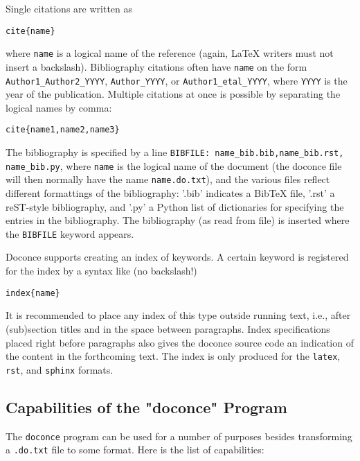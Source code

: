 \documentclass[twoside]{article}
\begin{document}
Single citations are written as
\begin{Verbatim}
cite{name}
\end{Verbatim}
where {\fontsize{10pt}{10pt}\verb!name!} is a logical name
of the reference (again, {\LaTeX} writers must not insert a backslash).
Bibliography citations often have {\fontsize{10pt}{10pt}\verb!name!} on the form
{\fontsize{10pt}{10pt}\verb!Author1_Author2_YYYY!}, {\fontsize{10pt}{10pt}\verb!Author_YYYY!}, or {\fontsize{10pt}{10pt}\verb!Author1_etal_YYYY!}, where
{\fontsize{10pt}{10pt}\verb!YYYY!} is the year of the publication.
Multiple citations at once is possible by separating the logical names
by comma:
\begin{Verbatim}
cite{name1,name2,name3}
\end{Verbatim}

The bibliography is specified by a line {\fontsize{10pt}{10pt}\verb!BIBFILE: name_bib.bib,name_bib.rst, name_bib.py!}, where {\fontsize{10pt}{10pt}\verb!name!} is the logical name of the
document (the doconce file will then normally have the name
{\fontsize{10pt}{10pt}\verb!name.do.txt!}), and the various files reflect different formattings of
the bibliography: '.bib' indicates a BibTeX file, '.rst' a reST-style
bibliography, and '.py' a Python list of dictionaries for specifying
the entries in the bibliography. The bibliography (as read from file)
is inserted where the {\fontsize{10pt}{10pt}\verb!BIBFILE!} keyword appears.

Doconce supports creating an index of keywords. A certain keyword
is registered for the index by a syntax like (no
backslash!)
\begin{Verbatim}
index{name}
\end{Verbatim}
It is recommended to place any index of this type outside
running text, i.e., after (sub)section titles and in the space between
paragraphs. Index specifications placed right before paragraphs also
gives the doconce source code an indication of the content in the
forthcoming text. The index is only produced for the {\fontsize{10pt}{10pt}\verb!latex!}, {\fontsize{10pt}{10pt}\verb!rst!}, and
{\fontsize{10pt}{10pt}\verb!sphinx!} formats.

\subsection{Capabilities of the "doconce" Program}

The {\fontsize{10pt}{10pt}\verb!doconce!} program can be used for a number of purposes besides
transforming a {\fontsize{10pt}{10pt}\verb!.do.txt!} file to some format. Here is the
list of capabilities:
\end{document}
